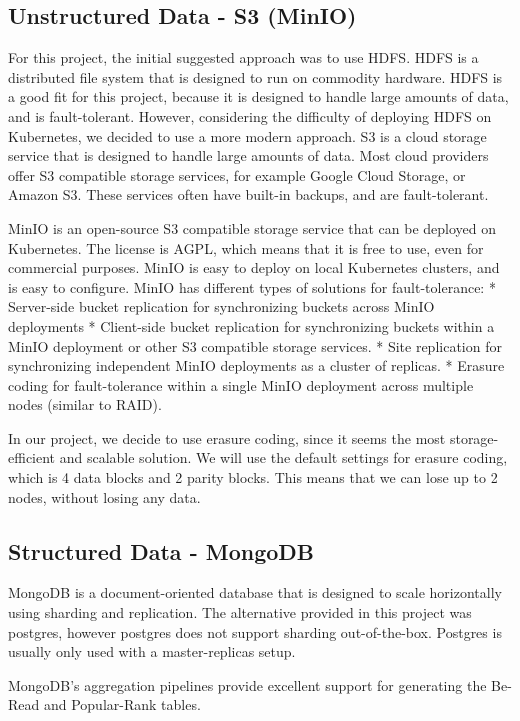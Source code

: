 \documentclass{article}
\begin{document}
    \subsection{Unstructured Data - S3 (MinIO)}
    For this project, the initial suggested approach was to use HDFS.
    HDFS is a distributed file system that is designed to run on commodity hardware.
    HDFS is a good fit for this project, because it is designed to handle large amounts of data, and is fault-tolerant.
    However, considering the difficulty of deploying HDFS on Kubernetes, we decided to use a more modern approach.
    S3 is a cloud storage service that is designed to handle large amounts of data.
    Most cloud providers offer S3 compatible storage services, for example Google Cloud Storage, or Amazon S3.
    These services often have built-in backups, and are fault-tolerant.

    MinIO is an open-source S3 compatible storage service that can be deployed on Kubernetes.
    The license is AGPL, which means that it is free to use, even for commercial purposes.
    MinIO is easy to deploy on local Kubernetes clusters, and is easy to configure.
    MinIO has different types of solutions for fault-tolerance:
    * Server-side bucket replication for synchronizing buckets across MinIO deployments
    * Client-side bucket replication for synchronizing buckets within a MinIO deployment or other S3 compatible storage services.
    * Site replication for synchronizing independent MinIO deployments as a cluster of replicas.
    * Erasure coding for fault-tolerance within a single MinIO deployment across multiple nodes (similar to RAID).

    In our project, we decide to use erasure coding, since it seems the most storage-efficient and scalable solution.
    We will use the default settings for erasure coding, which is 4 data blocks and 2 parity blocks.
    This means that we can lose up to 2 nodes, without losing any data.

    \subsection{Structured Data - MongoDB}
    MongoDB is a document-oriented database that is designed to scale horizontally using sharding and replication.
    The alternative provided in this project was postgres, however postgres does not support sharding out-of-the-box.
    Postgres is usually only used with a master-replicas setup.

    MongoDB's aggregation pipelines provide excellent support for generating the Be-Read and Popular-Rank tables.
\end{document}
